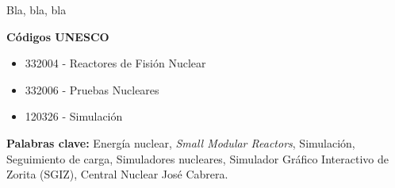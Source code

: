 \documentclass[a4paper, 11pt, spanish, twoside]{article}
\begin{document}
Bla, bla, bla

\vspace{0.6cm}
\textbf{Códigos UNESCO}
    \begin{itemize}
        \item 332004 - Reactores de Fisión Nuclear
        \item 332006 - Pruebas Nucleares
        \item 120326 - Simulación
    \end{itemize}

 \textbf{Palabras clave:} Energía nuclear, \textit{Small Modular Reactors}, Simulación, Seguimiento de carga, Simuladores nucleares, Simulador Gráfico Interactivo de Zorita (SGIZ), Central Nuclear José Cabrera.



\afterpage{\blankpage} %


\newpage
\renewcommand*\contentsname{ÍNDICE} %
\tableofcontents %
\afterpage{\blankpage} %

\newpage
{}



\end{document}
